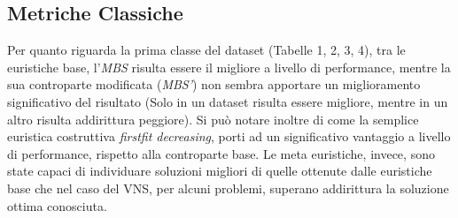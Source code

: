 \documentclass{article}
\begin{document}
\subsection{Metriche Classiche}
Per quanto riguarda la prima classe del dataset (Tabelle 1, 2, 3, 4), tra le euristiche base, l'\textit{MBS} risulta essere il migliore a livello di performance, mentre la sua controparte modificata (\textit{MBS'}) non sembra apportare un miglioramento significativo del risultato (Solo in un dataset risulta essere migliore, mentre in un altro risulta addirittura peggiore).  
\newline
\newline
Si può notare inoltre di come la semplice euristica costruttiva \textit{firstfit decreasing}, porti ad un significativo vantaggio a livello di performance, rispetto alla controparte base.
\newline
\newline
Le meta euristiche, invece, sono state capaci di individuare soluzioni migliori di quelle ottenute dalle euristiche base che nel caso del VNS, per alcuni problemi, superano addirittura la soluzione ottima conosciuta.

\begin{table}[H]
    \caption{Binpack1}
 \end{table}
 
 \begin{table}[H]
    \caption{Binpack2}
 \end{table}
 
\end{document}
